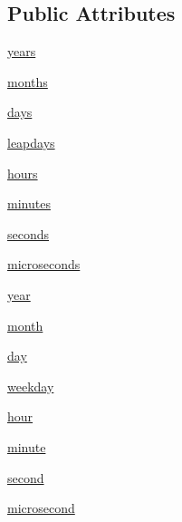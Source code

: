 \subsection*{Public Attributes}
\begin{DoxyCompactItemize}
\item 
\hyperlink{classdateutil_1_1relativedelta_1_1relativedelta_a41d4dc9153605fba9e94a60b0553be37}{years}
\item 
\hyperlink{classdateutil_1_1relativedelta_1_1relativedelta_a0f8be2ec688cefcd26c274a99d792464}{months}
\item 
\hyperlink{classdateutil_1_1relativedelta_1_1relativedelta_a29c0b653e4a6d10cc807080b3131deac}{days}
\item 
\hyperlink{classdateutil_1_1relativedelta_1_1relativedelta_a6a23b22fa4c3d9768f638d4635b8184c}{leapdays}
\item 
\hyperlink{classdateutil_1_1relativedelta_1_1relativedelta_a81bf800c94d25e57a2dbda0c045a18a8}{hours}
\item 
\hyperlink{classdateutil_1_1relativedelta_1_1relativedelta_a52b75e52a08433fe0532e9039b26f6ee}{minutes}
\item 
\hyperlink{classdateutil_1_1relativedelta_1_1relativedelta_a01ec488a0525282293272b642d42fb6c}{seconds}
\item 
\hyperlink{classdateutil_1_1relativedelta_1_1relativedelta_a9b118db029df967119db8631be810474}{microseconds}
\item 
\hyperlink{classdateutil_1_1relativedelta_1_1relativedelta_aea77709c6f3472f669fda031302e0c7f}{year}
\item 
\hyperlink{classdateutil_1_1relativedelta_1_1relativedelta_a8a4de74f39ebf2ea230db6f54d6298f0}{month}
\item 
\hyperlink{classdateutil_1_1relativedelta_1_1relativedelta_ac2a64da71b0015905cfb31aac6de3385}{day}
\item 
\hyperlink{classdateutil_1_1relativedelta_1_1relativedelta_a8c39a52542dc9f5979bcc8bdf901602e}{weekday}
\item 
\hyperlink{classdateutil_1_1relativedelta_1_1relativedelta_a0acef6ec4791a988d26202ba17898c77}{hour}
\item 
\hyperlink{classdateutil_1_1relativedelta_1_1relativedelta_a66392de48cca074d329212a881cd63c2}{minute}
\item 
\hyperlink{classdateutil_1_1relativedelta_1_1relativedelta_a03c53fdf8192d651739618fbfc0a412d}{second}
\item 
\hyperlink{classdateutil_1_1relativedelta_1_1relativedelta_a241b2a8fc74efac745a849156d10a054}{microsecond}
\end{DoxyCompactItemize}


